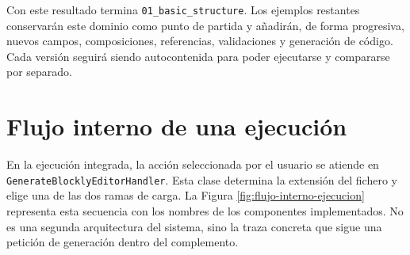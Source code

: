 Con este resultado termina \texttt{01\_basic\_structure}. Los ejemplos
restantes conservarán este dominio como punto de partida y añadirán, de forma
progresiva, nuevos campos, composiciones, referencias, validaciones y generación
de código. Cada versión seguirá siendo autocontenida para poder ejecutarse y
compararse por separado.

\section{Flujo interno de una ejecución}
\label{sec:flujo-interno-ejecucion}

En la ejecución integrada, la acción seleccionada por el usuario se atiende en
\texttt{GenerateBlocklyEditorHandler}. Esta clase determina la extensión del
fichero y elige una de las dos ramas de carga. La Figura
\ref{fig:flujo-interno-ejecucion} representa esta secuencia con los nombres de
los componentes implementados. No es una segunda arquitectura del sistema, sino
la traza concreta que sigue una petición de generación dentro del complemento.

